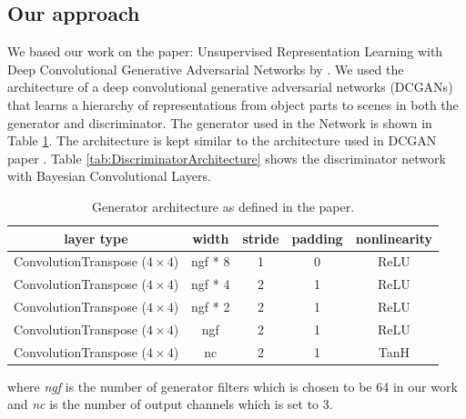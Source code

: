 \subsection{Our approach}

We based our work on the paper:  Unsupervised Representation Learning with Deep Convolutional Generative Adversarial Networks by  \citet{DBLP:journals/corr/RadfordMC15}. We used the architecture of a deep convolutional generative adversarial networks (DCGANs) that learns a hierarchy of representations from object parts to scenes in both the generator and discriminator.
The generator used in the Network is shown in Table \ref{tab:GeneratorArchitecture}. The architecture is kept similar to the architecture used in DCGAN paper \cite{DBLP:journals/corr/RadfordMC15}. Table \ref{tab:DiscriminatorArchitecture} shows the discriminator network with Bayesian Convolutional Layers. 

\begin{table}[H]
    \centering
    \renewcommand{\arraystretch}{2}
    \begin{tabular}{c c c c c} 
 \hline
 layer type & width & stride & padding & nonlinearity \\ [0.5ex] 
 \hline
 ConvolutionTranspose ($4\times4$) & ngf * 8 & 1 & 0  & ReLU \\ 
 

 ConvolutionTranspose ($4\times4$) & ngf * 4 & 2 & 1  & ReLU \\
 
 
 ConvolutionTranspose ($4\times4$) & ngf * 2 & 2 & 1 & ReLU \\
 
 ConvolutionTranspose ($4\times4$) & ngf & 2 & 1  & ReLU \\
 
 ConvolutionTranspose ($4\times4$) & nc & 2 & 1 & TanH \\ [1ex] 
 \hline
\end{tabular}
\renewcommand{\arraystretch}{1}
\caption{Generator architecture as defined in the paper. \cite{DBLP:journals/corr/RadfordMC15}}
\label{tab:GeneratorArchitecture}
\end{table}

where \textit{ngf} is the number of generator filters which is chosen to be 64 in our work and \textit{nc} is the number of output channels which is set to 3. 

